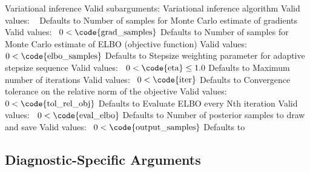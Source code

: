 \begin{description}
%
    {Variational inference}
    {Valid subarguments: }
%
      {Variational inference algorithm}
      {Valid values: \ }
      {Defaults to }
%
      {Number of samples for Monte Carlo estimate of gradients}
      {Valid values: \ $0 < \mbox{\code{grad\_samples}}$}
      {Defaults to }
%
      {Number of samples for Monte Carlo estimate of ELBO (objective function)}
      {Valid values: \ $0 < \mbox{\code{elbo\_samples}}$}
      {Defaults to }
%
      {Stepsize weighting parameter for adaptive stepsize sequence}
      {Valid values: \ $0 < \mbox{\code{eta}} \leq 1.0$}
      {Defaults to }
%
      {Maximum number of iterations}
      {Valid values: \ $0 < \mbox{\code{iter}}$}
      {Defaults to }
%
      {Convergence tolerance on the relative norm of the objective}
      {Valid values: \ $0 < \mbox{\code{tol\_rel\_obj}}$}
      {Defaults to }
%
      {Evaluate ELBO every Nth iteration}
      {Valid values: \ $0 < \mbox{\code{eval\_elbo}}$}
      {Defaults to }
%
      {Number of posterior samples to draw and save}
      {Valid values: \ $0 < \mbox{\code{output\_samples}}$}
      {Defaults to }
\end{description}
%


\subsection{Diagnostic-Specific Arguments}

